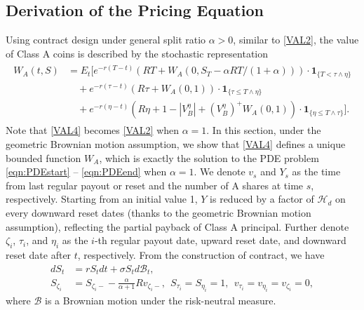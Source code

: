 \documentclass[draft, noinfoline]{ectaart}
\numberwithin{equation}{section}
\theoremstyle{plain}
\begin{document}
\begin{appendices}

\section{Derivation of the Pricing Equation}
\label{dpe}
Using contract design under general split ratio $\alpha>0$, similar to \eqref{VAL2}, the value of Class A coins is described by the stochastic representation
\begin{align}
\begin{split}W_{A}(t,S) & =E_{t}\Bigg[e^{-r(T-t)}(RT+W_A(0,S_T-\alpha RT/(1+\alpha)))\cdot\mathbf{1}_{\{T<\tau\land\eta\}}\\
&\quad+e^{-r(\tau-t)}(R\tau+W_{A}(0,1))\cdot\mathbf{1}_{\{\tau\le T\land\eta\}}\\
 & \quad+e^{-r(\eta-t)}(R\eta+1-|V_{B}^{\eta}|+(V_{B}^{\eta})^+W_{A}(0,1))\cdot\mathbf{1}_{\{\eta\le T\land\tau\}}\Bigg].
\end{split}
\label{VAL4}
\end{align}
Note that \eqref{VAL4} becomes \eqref{VAL2} when $\alpha=1$. In this section, under the geometric Brownian motion assumption, we show that \eqref{VAL4} defines a unique bounded function $W_A$, which is exactly the solution to the PDE problem \eqref{eqn:PDEstart} -- \eqref{eqn:PDEend} when $\alpha=1$. We denote $v_s$ and $Y_s$ as the time from last regular payout or reset and the number of A shares at time $s$, respectively. Starting from an initial value 1, $Y$ is reduced by a factor of $\mathcal{H}_d$ on every downward reset dates (thanks to the geometric Brownian motion assumption), reflecting the partial payback of Class A principal. Further denote $\zeta_i$, $\tau_i$, and $\eta_i$ as the $i$-th regular payout date, upward reset date, and downward reset date after $t$, respectively.
From the construction of contract, we have
\begin{align*}
dS_t &= rS_tdt+\sigma S_td\mathcal{B}_t,\\
S_{\zeta_i}&=S_{\zeta_i-}-\frac{\alpha}{\alpha+1}Rv_{\zeta_i-},~~ S_{\tau_i}=S_{\eta_i}=1, ~~v_{\tau_i}=v_{\eta_i}=v_{\zeta_i}=0,
\end{align*}
where $\mathcal{B}$ is a Brownian motion under the risk-neutral measure.


\end{appendices}
\end{document}
